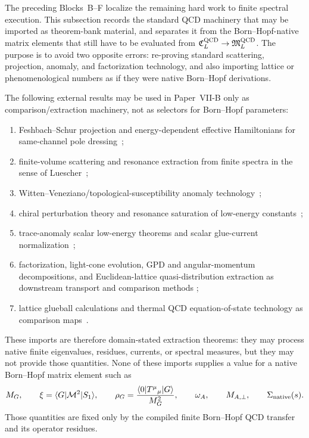\documentclass[12pt,a4paper]{article}
\begin{document}
The preceding Blocks~B--F localize the remaining hard work to finite spectral execution.  This subsection records the standard QCD machinery that may be imported as theorem-bank material, and separates it from the Born--Hopf-native matrix elements that still have to be evaluated from \(\mathfrak C_L^{\rm QCD}\to\mathfrak M_L^{\rm QCD}\).  The purpose is to avoid two opposite errors: re-proving standard scattering, projection, anomaly, and factorization technology, and also importing lattice or phenomenological numbers as if they were native Born--Hopf derivations.

\begin{theorem}
\label{p11:thm:standard-method-import-boundary}
\begin{sloppypar}
The following external results may be used in Paper~VII-B only as comparison/extraction machinery, not as selectors for Born--Hopf parameters:
\begin{enumerate}[label=(\roman*), leftmargin=2.2em]
\item Feshbach--Schur projection and energy-dependent effective Hamiltonians for same-channel pole dressing~\cite{Feshbach1958,Feshbach1962};
\item finite-volume scattering and resonance extraction from finite spectra in the sense of Luescher~\cite{Luscher1986Volume,Luscher1991TwoParticle,Luscher1991Unstable};
\item Witten--Veneziano/topological-susceptibility anomaly technology~\cite{Witten1979CurrentAlgebra,Veneziano1979};
\item chiral perturbation theory and resonance saturation of low-energy constants~\cite{GasserLeutwyler1984,EckerGasserPichDeRafael1989};
\item trace-anomaly scalar low-energy theorems and scalar glue-current normalization~\cite{NovikovShifmanVainshteinZakharov1981,ShifmanVainshteinZakharov1978};
\item factorization, light-cone evolution, GPD and angular-momentum
decompositions, and Euclidean-lattice quasi-distribution extraction as
downstream transport and comparison methods
\cite{EfremovRadyushkin1980,Ji1997,Radyushkin1997,Ji2013LaMET};
\item lattice glueball calculations and thermal QCD equation-of-state technology
as comparison maps~\cite{MorningstarPeardon1999,Borsanyi2014EoS}.
\end{enumerate}
These imports are therefore domain-stated extraction theorems: they may process native finite eigenvalues, residues, currents, or spectral measures, but they may not provide those quantities.
None of these imports supplies a value for a native Born--Hopf matrix element such as
\begin{equation}
M_G,
\qquad
\xi=\langle G|\mathcal M^2|S_1\rangle,
\qquad
\rho_G=\frac{\langle0|T^\mu{}_{\mu}|G\rangle}{M_G^2},
\qquad
\omega_A,
\qquad
M_{A,\perp},
\qquad
\Sigma_{\rm native}(s).
\end{equation}
Those quantities are fixed only by the compiled finite Born--Hopf QCD transfer and its operator residues.
\end{sloppypar}
\end{theorem}
\end{document}
